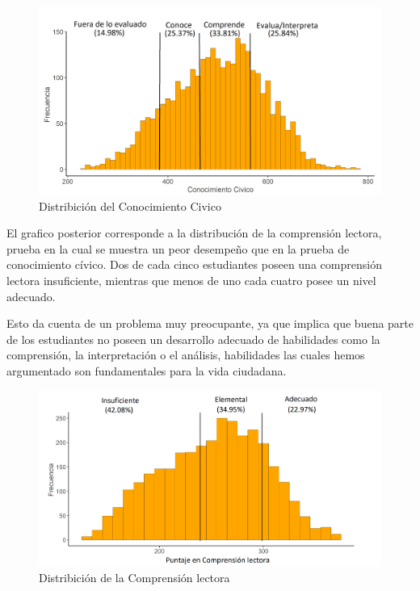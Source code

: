 \documentclass[12pt,twoside]{templates/facsothesis}
\begin{document}
\begin{figure}

{\centering \includegraphics[width=1.1\linewidth]{images/dist} 

}

\caption{Distribición del Conocimiento Civico}\label{fig:unnamed-chunk-6}
\end{figure}

\newpage

El grafico posterior corresponde a la distribución de la comprensión lectora, prueba en la cual se muestra un peor desempeño que en la prueba de conocimiento cívico. Dos de cada cinco estudiantes poseen una comprensión lectora insuficiente, mientras que menos de uno cada cuatro posee un nivel adecuado.

Esto da cuenta de un problema muy preocupante, ya que implica que buena parte de los estudiantes no poseen un desarrollo adecuado de habilidades como la comprensión, la interpretación o el análisis, habilidades las cuales hemos argumentado son fundamentales para la vida ciudadana.

\begin{figure}

{\centering \includegraphics[width=1.1\linewidth]{images/dist2} 

}

\caption{Distribición de la Comprensión lectora}\label{fig:unnamed-chunk-7}
\end{figure}
\end{document}
